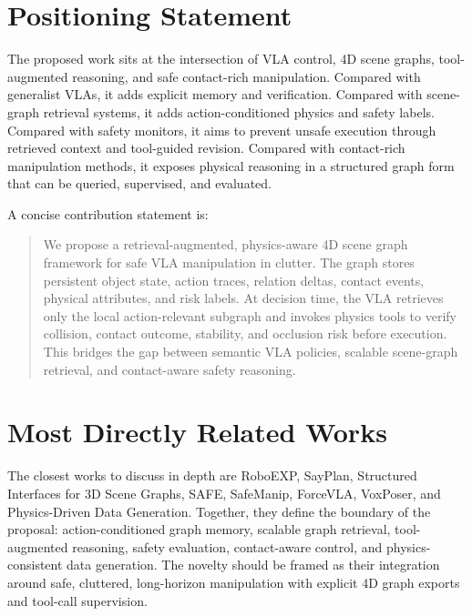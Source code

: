 \section*{Positioning Statement}

The proposed work sits at the intersection of VLA control, 4D scene graphs, tool-augmented reasoning, and safe contact-rich manipulation. Compared with generalist VLAs, it adds explicit memory and verification. Compared with scene-graph retrieval systems, it adds action-conditioned physics and safety labels. Compared with safety monitors, it aims to prevent unsafe execution through retrieved context and tool-guided revision. Compared with contact-rich manipulation methods, it exposes physical reasoning in a structured graph form that can be queried, supervised, and evaluated.

A concise contribution statement is:

\begin{quote}
We propose a retrieval-augmented, physics-aware 4D scene graph framework for safe VLA manipulation in clutter. The graph stores persistent object state, action traces, relation deltas, contact events, physical attributes, and risk labels. At decision time, the VLA retrieves only the local action-relevant subgraph and invokes physics tools to verify collision, contact outcome, stability, and occlusion risk before execution. This bridges the gap between semantic VLA policies, scalable scene-graph retrieval, and contact-aware safety reasoning.
\end{quote}

\section*{Most Directly Related Works}

The closest works to discuss in depth are RoboEXP, SayPlan, Structured Interfaces for 3D Scene Graphs, SAFE, SafeManip, ForceVLA, VoxPoser, and Physics-Driven Data Generation. Together, they define the boundary of the proposal: action-conditioned graph memory, scalable graph retrieval, tool-augmented reasoning, safety evaluation, contact-aware control, and physics-consistent data generation. The novelty should be framed as their integration around safe, cluttered, long-horizon manipulation with explicit 4D graph exports and tool-call supervision.

